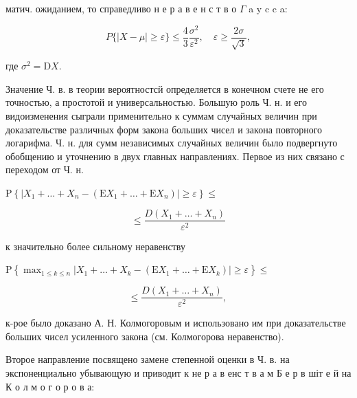 \documentclass[10pt]{article}
\begin{document}
матич. ожиданием, то справедливо н е р а в е н с т в о $\Gamma$ a y c c a:



\[

P\{|X-\mu| \geqslant \varepsilon\} \leqslant \frac{4}{3} \frac{\sigma^{2}}{\varepsilon^{2}}, \quad \varepsilon \geqslant \frac{2 \sigma}{\sqrt{3}},

\]



где $\sigma^{2}=\mathrm{D} X$.



Значение Ч. в. в теории вероятностсй определяется в конечном счете не его точностью, а простотой и универсальностью. Большую роль Ч. н. и его видоизменения сыграли применительно к суммам случайных величин при доказательстве различных форм закона больших чисел и закона повторного логарифма. Ч. н. для сумм независимых случайных величин было подвергнуто обобщению и уточнению в двух главных направлениях. Первое из них связано с переходом от Ч. н.



$\mathrm{P}\left\{\left|X_{1}+\ldots+X_{n}-\left(\mathrm{E} X_{1}+\ldots+\mathrm{E} X_{n}\right)\right| \geqslant \varepsilon\right\} \leqslant$



\[

\leqslant \frac{D\left(X_{1}+\ldots+X_{n}\right)}{\varepsilon^{2}}

\]



к значительно более сильному неравенству



$\mathrm{P}\left\{\max _{1 \leqslant k \leqslant n}\left|X_{1}+\ldots+X_{k}-\left(\mathrm{E} X_{1}+\ldots+\mathrm{E} X_{k}\right)\right| \geqslant \varepsilon\right\} \leqslant$



\[

\leqslant \frac{D\left(X_{1}+\ldots+X_{n}\right)}{\varepsilon^{2}} \text {, }

\]



к-рое было доказано А. Н. Колмогоровым и использовано им при доказательстве больших чисел усиленного закона (см. Колмогорова неравенство).



Второе направление посвящено замене степенной оценки в Ч. в. на экспоненциально убывающую и приводит к не р а в енс т в а м Б е р в шіт е й на К о л м о г о р о в а:
\end{document}

